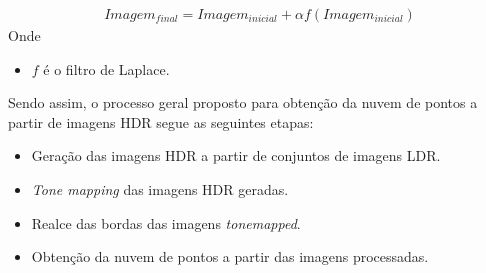 \begin{align} \label{eqPontosLaplaceSoma}
	Imagem_{final} = Imagem_{inicial} + \alpha f(Imagem_{inicial})
\end{align}
Onde
\begin{itemize}
\item $f$ é o filtro de Laplace.
\end{itemize}

  Sendo assim, o processo geral proposto para obtenção da nuvem de pontos a partir de imagens HDR segue as seguintes etapas:

\begin{itemize}
\item Geração das imagens HDR a partir de conjuntos de imagens LDR.
\item \textit{Tone mapping} das imagens HDR geradas.
\item Realce das bordas das imagens \textit{tonemapped}.
\item Obtenção da nuvem de pontos a partir das imagens processadas.
\end{itemize}